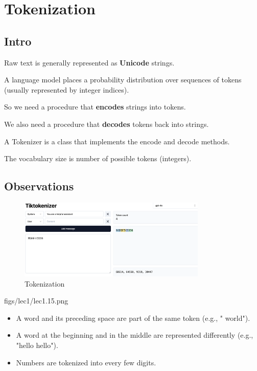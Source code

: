 \hypertarget{lec1:tokenization}{}
{\chaptoc\noindent\begin{minipage}[inner sep=0,outer sep=0]{0.9\linewidth}\section{Tokenization}\end{minipage}}

\subsection{Intro}
Raw text is generally represented as \textbf{Unicode} strings.

A language model places a probability distribution over sequences of tokens (usually represented by integer indices).
    
So we need a procedure that {\color{tred}\textbf{encodes} strings into tokens.}

We also need a procedure that {\color{tred}\textbf{decodes} tokens back into strings.}

A  Tokenizer is a class that implements the encode and decode methods.

The vocabulary size is number of possible tokens (integers).

\subsection{Observations}

\begin{figure}[ht]
  \centering
  \includegraphics[width=0.8\textwidth]{figs/lec1/lec1.14.png}
  \caption{Tokenization}
  \label{fig:Tokenize}
\end{figure}

\MarginImageWithNote
  {figs/lec1/lec1.15.png}
  {}
  


\begin{itemize}
    \item A word and its preceding space are part of the same token (e.g., " world").
    \item A word at the beginning and in the middle are represented differently (e.g., "hello hello").
    \item Numbers are tokenized into every few digits.
\end{itemize}

